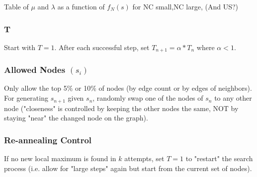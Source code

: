 \documentclass{article}
\begin{document}
	Table of $\mu$ and $\lambda$ as a function of $f_N(s)$ for NC small,NC large, (And US?)
	
	\subsubsection{T}
	
	Start with $T = 1$. After each successful step, set $T_{n+1} = \alpha*T_n$ where $\alpha < 1$.

	\subsubsection{Allowed Nodes $(s_i)$}
	
	Only allow the top 5\% or 10\% of nodes (by edge count or by edges of neighbors). For generating $s_{n+1}$ given $s_n$, randomly swap one of the nodes of $s_n$ to any other node ("closeness" is controlled by keeping the other nodes the same, NOT by staying "near" the changed node on the graph).
	
	\subsubsection{Re-annealing Control}

	If no new local maximum is found in $k$  attempts, set $T = 1$ to "restart" the search process (i.e. allow for "large steps" again but start from the current set of nodes).
	
	
	
	
\end{document}
